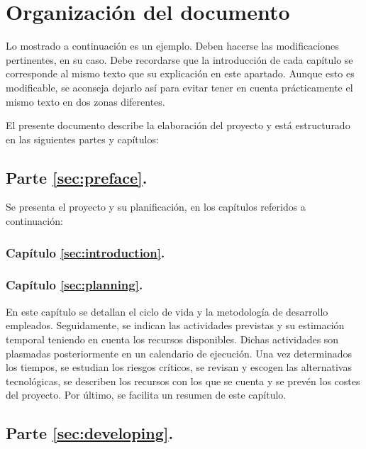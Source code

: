 \section{Organización del documento}
\label{sec:organization}

\begin{shaded}
Lo mostrado a continuación es un ejemplo. Deben hacerse las modificaciones pertinentes, en su caso. Debe recordarse que la introducción de cada capítulo se corresponde al mismo texto que su explicación en este apartado. Aunque esto es modificable, se aconseja dejarlo así para evitar tener en cuenta prácticamente el mismo texto en dos zonas diferentes.
\end{shaded}
El presente documento describe la elaboración del proyecto y está estructurado en las siguientes partes y capítulos:

\subsection*{Parte \ref{sec:preface}. }

Se presenta el proyecto y su planificación, en los capítulos referidos a continuación:

\subsubsection*{Capítulo \ref{sec:introduction}. }

\introIntroduction %

\subsubsection*{Capítulo \ref{sec:planning}. }

\def \introPlanning {En este capítulo se detallan el ciclo de vida y la metodología de desarrollo empleados. Seguidamente, se indican las actividades previstas y su estimación temporal teniendo en cuenta los recursos disponibles. Dichas actividades son plasmadas posteriormente en un calendario de ejecución. Una vez determinados los tiempos, se estudian los riesgos críticos, se revisan y escogen las alternativas tecnológicas, se describen los recursos con los que se cuenta y se prevén los costes del proyecto. Por último, se facilita un resumen de este capítulo.}

\introPlanning

\subsection*{Parte \ref{sec:developing}. }

